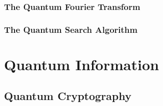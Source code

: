 \documentclass{article}
\begin{document}
        \subsubsection{The Quantum Fourier Transform}

        \subsubsection{The Quantum Search Algorithm}

\section{Quantum Information}

    \subsection{Quantum Cryptography}

\newpage
\nocite{*}
\printbibliography
\end{document}
